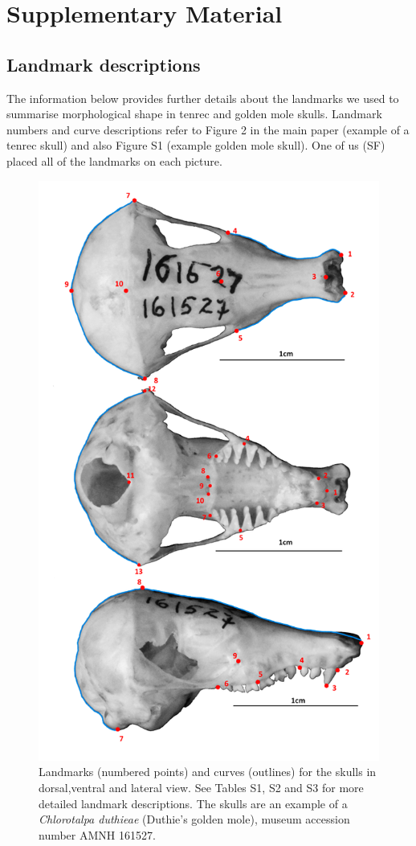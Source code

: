 \documentclass[12pt,a4paper]{article}
\newcommand{\beginsupplement}{%
	       \setcounter{table}{0}
	        \renewcommand{\thetable}{S\arabic{table}}%
	        \setcounter{figure}{0}
	        \renewcommand{\thefigure}{S\arabic{figure}}%
	     }
\begin{document}
\beginsupplement

{\centering\section{Supplementary Material}}

\subsection{Landmark descriptions}
\vspace*{-0.5cm}
	The information below provides further details about the landmarks we used to summarise morphological shape in tenrec and golden mole skulls. Landmark numbers and curve descriptions refer to Figure 2 in the main paper (example of a tenrec skull) and also Figure S1 (example golden mole skull). One of us (SF) placed all of the landmarks on each picture.
	
	
	\begin{figure}[!htbp]
	\centering
	\includegraphics[width=0.8\linewidth, height=0.8\textheight, keepaspectratio]{figures/Gmole_combined_col_light.png}
	\caption[]
		{Landmarks (numbered points) and curves (outlines) for the skulls in dorsal,ventral and lateral view. See Tables S1, S2 and S3 for more detailed landmark descriptions. The skulls are an example of a \textit{Chlorotalpa duthieae} (Duthie's golden mole), museum accession number AMNH 161527.}
	\label{fig:gmole}
	\end{figure}
\end{document}
